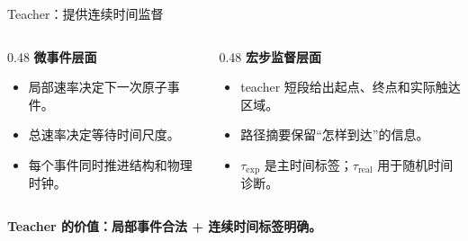 \documentclass[aspectratio=43,10pt]{beamer}
\newcommand{\hl}[1]{\textcolor{thuPurple}{\textbf{#1}}}
\newcommand{\tightitems}{\setlength{\itemsep}{0.35em}}
\begin{document}
\begin{frame}{Teacher：提供连续时间监督}
  \begin{columns}[T,onlytextwidth]
    \begin{column}{0.48\textwidth}
      \textbf{微事件层面}
      \begin{itemize}
        \tightitems
        \item 局部速率决定下一次原子事件。
        \item 总速率决定等待时间尺度。
        \item 每个事件同时推进结构和物理时钟。
      \end{itemize}
    \end{column}
    \begin{column}{0.48\textwidth}
      \textbf{宏步监督层面}
      \begin{itemize}
        \tightitems
        \item teacher 短段给出起点、终点和实际触达区域。
        \item 路径摘要保留“怎样到达”的信息。
        \item \(\tau_{\mathrm{exp}}\) 是主时间标签；\(\tau_{\mathrm{real}}\) 用于随机时间诊断。
      \end{itemize}
    \end{column}
  \end{columns}
  \vspace{0.7cm}
  \begin{center}
    \large \hl{Teacher 的价值：局部事件合法 + 连续时间标签明确。}
  \end{center}
\end{frame}
\end{document}
